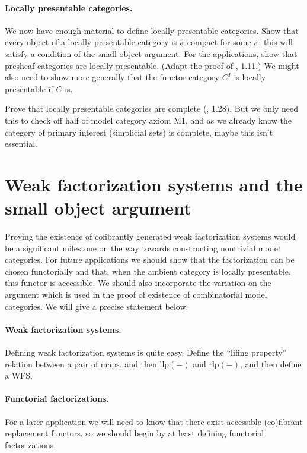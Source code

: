 \documentclass{article}
\theoremstyle{definition}
\theoremstyle{plain}
\newcommand{\llp}{\mathrm{llp}}
\newcommand{\rlp}{\mathrm{rlp}}
\begin{document}
\paragraph{Locally presentable categories.}
We now have enough material to define locally presentable categories.
Show that every object of a locally presentable category is $\kappa$-compact for some $\kappa$; this will satisfy a condition of the small object argument.
For the applications, show that presheaf categories are locally presentable.
(Adapt the proof of \cite{AR}, 1.11.)
We might also need to show more generally that the functor category $C^I$ is locally presentable if $C$ is.

Prove that locally presentable categories are complete (\cite{AR}, 1.28).
But we only need this to check off half of model category axiom M1, and as we already know the category of primary interest (simplicial sets) is complete, maybe this isn't essential.

\section{Weak factorization systems and the small object argument}

Proving the existence of cofibrantly generated weak factorization systems would be a significant milestone on the way towards constructing nontrivial model categories.
For future applications we should show that the factorization can be chosen functorially and that, when the ambient category is locally presentable, this functor is accessible.
We should also incorporate the variation on the argument which is used in the proof of existence of combinatorial model categories.
We will give a precise statement below.

\paragraph{Weak factorization systems.}
Defining weak factorization systems is quite easy.
Define the ``lifing property'' relation between a pair of maps, and then $\llp(-)$ and $\rlp(-)$, and then define a WFS.

\paragraph{Functorial factorizations.}
For a later application we will need to know that there exist accessible (co)fibrant replacement functors, so we should begin by at least defining functorial factorizations.
\end{document}
